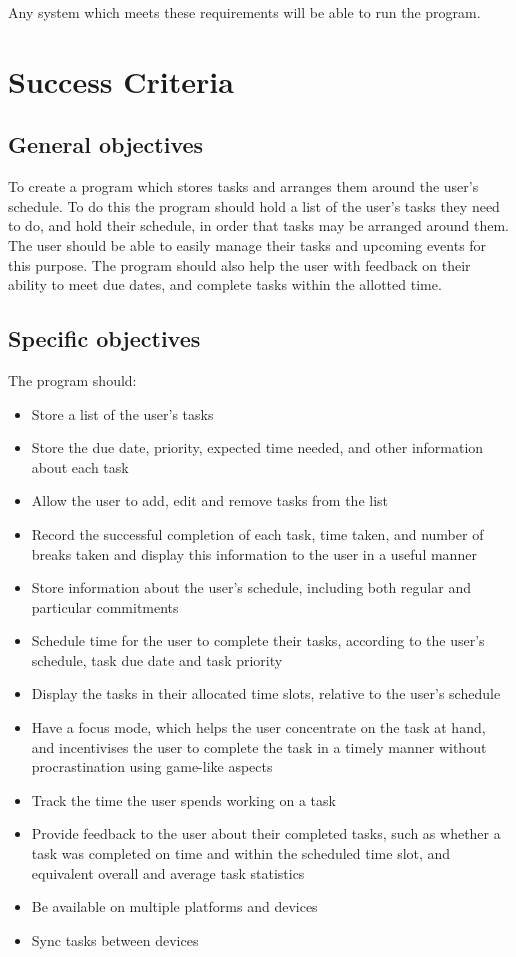 \documentclass{article}
\begin{document}
Any system which meets these requirements will be able to run the program.

\section{Success Criteria}

\subsection{General objectives}
To create a program which stores tasks and arranges them around the user's schedule.
To do this the program should hold a list of the user's tasks they need to do,
and hold their schedule,
in order that tasks may be arranged around them.
The user should be able to easily manage their tasks and upcoming events for this purpose.
The program should also help the user with feedback on their ability to meet due dates,
and complete tasks within the allotted time.

\subsection{Specific objectives}
The program should:

\begin{itemize}
	\item Store a list of the user's tasks
	\item Store the due date, priority, expected time needed, and other information
	      about each task
	\item Allow the user to add, edit and remove tasks from the list
	\item Record the successful completion of each task, time taken, and number of
	      breaks taken and display this information to the user in a useful manner
	\item Store information about the user's schedule,
	      including both regular and particular commitments
	\item Schedule time for the user to complete their tasks, according to the
	      user's schedule, task due date and task priority
	\item Display the tasks in their allocated time slots,
	      relative to the user's schedule
	\item Have a focus mode, which helps the user concentrate on the task at hand,
	      and incentivises the user to complete the task in a timely manner without
	      procrastination using game-like aspects
	\item Track the time the user spends working on a task
	\item Provide feedback to the user about their completed tasks,
	      such as whether a task was completed on time and within the scheduled time slot,
	      and equivalent overall and average task statistics
	\item Be available on multiple platforms and devices
	\item Sync tasks between devices
\end{itemize}
\end{document}
